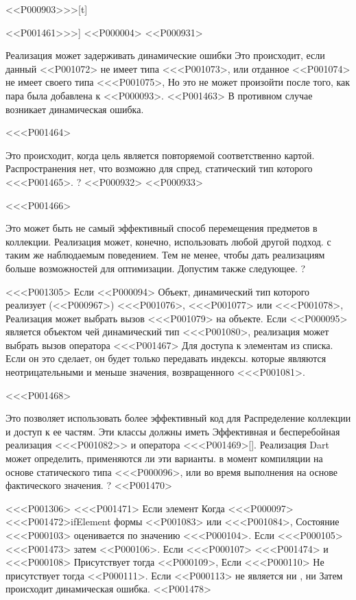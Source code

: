 {{{{{{{\vspace{-2ex}<<P000903>>>[t]{<<P001461>>>]
<<P000004>
<<P000931>

Реализация может задерживать динамические ошибки
Это происходит, если данный <<P001072> не имеет типа <<<P001073>,
или отданное <<P001074> не имеет своего типа <<<P001075>,
Но это не может произойти после того, как пара была добавлена к <<P000093>.
<<P001463>
В противном случае возникает динамическая ошибка.

<<<P001464>{%
Это происходит, когда цель является повторяемой соответственно картой.
Распространения нет, что возможно для
спред, статический тип которого <<<P001465>.%
?
<<P000932>
<<P000933>

<<<P001466>{%
Это может быть не самый эффективный способ перемещения предметов в коллекции.
Реализация может, конечно, использовать любой другой подход.
с таким же наблюдаемым поведением.
Тем не менее, чтобы дать реализациям больше возможностей для оптимизации.
Допустим также следующее.%
?

<<<P001305>%
Если <<P000094> Объект, динамический тип которого реализует
(<<P000967>)
<<<P001076>, <<<P001077> или <<<P001078>,
Реализация может выбрать вызов <<<P001079> на объекте.
Если <<P000095> является объектом
чей динамический тип <<<P001080>,
реализация может выбрать вызов оператора <<<P001467>
Для доступа к элементам из списка.
Если он это сделает, он будет только передавать индексы.
которые являются неотрицательными и меньше значения, возвращенного <<<P001081>.

<<<P001468>{%
Это позволяет использовать более эффективный код для
Распределение коллекции и доступ к ее частям.
Эти классы должны иметь
Эффективная и бесперебойная реализация
<<<P001082>> и оператора <<<P001469>{[]}.
Реализация Dart может определить, применяются ли эти варианты.
в момент компиляции на основе статического типа <<<P000096>,
или во время выполнения на основе фактического значения.%
?
<<P001470>

<<<P001306>%
<<<P001471> Если элемент
Когда <<<P000097> <<<P001472>{ifElement} формы
<<P001083> или
<<<P001084>,
Состояние <<<P000103> оценивается по значению <<<P000104>.
Если <<<P000105> <<<P001473> затем
<<P000106>.
Если <<<P000107> <<<P001474>{} и <<<P000108> Присутствует тогда
<<P000109>,
Если <<<P000110> Не присутствует тогда
<<P000111>.
Если <<P000113> не является ни \TRUE{}, ни \FALSE{} Затем происходит динамическая ошибка.
<<P001478>

}}}}}}}}}}}
